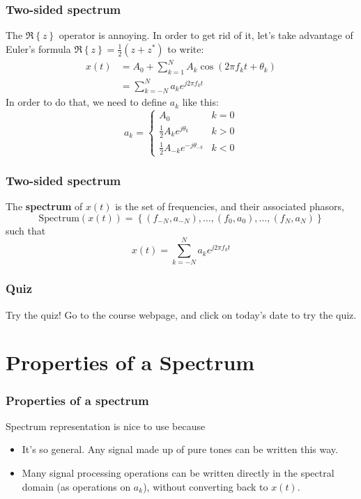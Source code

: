 \documentclass{beamer}
\begin{document}
\begin{frame}
  \frametitle{Two-sided spectrum}

  The $\Re\left\{z\right\}$ operator is annoying.  In order to get rid
  of it, let's take advantage of Euler's formula
  $\Re\left\{z\right\}=\frac{1}{2}(z+z^*)$ to write:
  \begin{align*}
    x(t) &= A_0+ \sum_{k=1}^N A_k\cos\left(2\pi f_kt+\theta_k\right)\\
    &= \sum_{k=-N}^N a_k e^{j2\pi f_k t}    
  \end{align*}
  In order to do that, we need to define $a_k$ like this:
  \[
  a_k = \begin{cases}
    A_0 & k=0\\
    \frac{1}{2}A_ke^{j\theta_k} & k>0\\
    \frac{1}{2}A_{-k}e^{-j\theta_{-k}} & k < 0
  \end{cases}
  \]  
\end{frame}

\begin{frame}
  \frametitle{Two-sided spectrum}

  The {\bf spectrum} of $x(t)$ is the set of frequencies, and their
  associated phasors,
  \[
  \mbox{Spectrum}\left( x(t) \right) =
  \left\{ (f_{-N},a_{-N}), \ldots, (f_0,a_0), \ldots, (f_N,a_N) \right\}
  \]
  such that
  \[
  x(t) = \sum_{k=-N}^N a_ke^{j2\pi f_kt}
  \]
\end{frame}

\begin{frame}
  \frametitle{Quiz}

  Try the quiz!  Go to the course webpage, and click on today's date to try the quiz.
\end{frame}

\section[Properties]{Properties of a Spectrum}
\setcounter{subsection}{1}

\begin{frame}
  \frametitle{Properties of a spectrum}

  Spectrum representation is nice to use because
  \begin{itemize}
  \item It's so general.  Any signal made up of pure tones can be written this way.
  \item Many signal processing operations can be written directly in
    the spectral domain (as operations on $a_k$), without converting
    back to $x(t)$.
  \end{itemize}
\end{frame}
\end{document}
